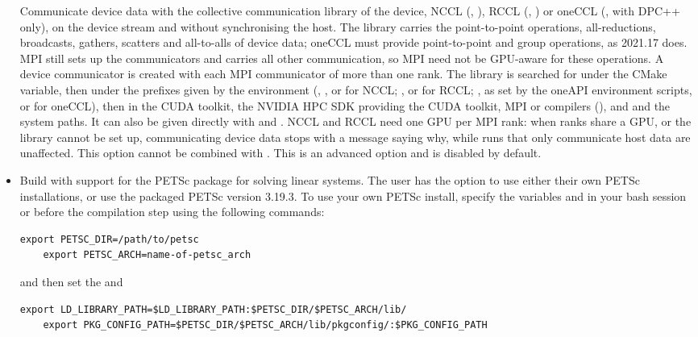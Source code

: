 \begin{itemize}
    Communicate device data with the collective communication library of the
    device, NCCL (, ), RCCL (,
    ) or oneCCL (, with DPC++ only), on the
    device stream and without synchronising the host. The library carries the
    point-to-point operations, all-reductions, broadcasts, gathers, scatters
    and all-to-alls of device data; oneCCL must provide point-to-point and
    group operations, as 2021.17 does. MPI still sets up the
    communicators and carries all other communication, so MPI need not be
    GPU-aware for these operations. A device communicator is created with each
    MPI communicator of more than one rank. The library is searched for under
    the  CMake variable, then under the prefixes given by the
    environment (, , 
    or  for NCCL; ,  or
     for RCCL; , as set by the oneAPI
    environment scripts, or  for oneCCL), then in the CUDA
    toolkit, the NVIDIA HPC SDK providing the CUDA toolkit, MPI or compilers
    (),  and
     and the system paths. It can also be given directly with  and
    . NCCL and RCCL need one GPU per MPI rank: when ranks
    share a GPU, or the library cannot be set up, communicating device data
    stops with a message saying why, while runs that only communicate host data
    are unaffected. This option cannot be combined with
    . This is an advanced option and is
    disabled by default.

    \item {}

    Build \nekpp with support for the PETSc package for solving linear systems. 
    The user has the option to use either their own PETSc installations, or use 
    the packaged PETSc version 3.19.3. To use your own PETSc install, specify 
    the variables  and  in your bash session 
    or  before the \nekpp compilation step using the following commands:

    \begin{lstlisting}[style=BashInputStyle]
    export PETSC_DIR=/path/to/petsc
    export PETSC_ARCH=name-of-petsc_arch
    \end{lstlisting}
    and then set the  and 
    \begin{lstlisting}[style=BashInputStyle]
    export LD_LIBRARY_PATH=$LD_LIBRARY_PATH:$PETSC_DIR/$PETSC_ARCH/lib/
    export PKG_CONFIG_PATH=$PETSC_DIR/$PETSC_ARCH/lib/pkgconfig/:$PKG_CONFIG_PATH
    \end{lstlisting}


\end{itemize}
